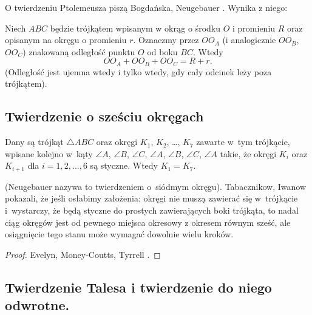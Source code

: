 O twierdzeniu Ptolemeusza piszą Bogdańska, Neugebauer \cite[s. 62, 63]{neugebauer_2018}.
Wynika z niego:

\begin{theorem}[Carnot, 1???]
    Niech $ABC$ będzie trójkątem wpisanym w okrąg o środku $O$ i promieniu $R$ oraz opisanym na okręgu o promieniu $r$.
    Oznaczmy przez $OO_A$ (i analogicznie $OO_B$, $OO_C$) znakowaną odległość punktu $O$ od boku $BC$.
    Wtedy 
    \begin{equation}
        OO_A + OO_B + OO_C = R + r.
    \end{equation}
    (Odległość jest ujemna wtedy i tylko wtedy, gdy cały odcinek leży poza trójkątem).
\end{theorem}


%
\subsection{Twierdzenie o sześciu okręgach}

\begin{proposition}
%
    Dany są trójkąt $\triangle ABC$ oraz okręgi $K_1$, $K_2$, \ldots, $K_7$ zawarte w~tym trójkącie, wpisane kolejno w~kąty $\angle A$, $\angle B$, $\angle C$, $\angle A$, $\angle B$, $\angle C$, $\angle A$ takie, że okręgi $K_i$ oraz $K_{i+1}$ dla $i = 1, 2, \ldots, 6$ są styczne.
    Wtedy $K_1 = K_7$.
\end{proposition}

(Neugebauer \cite[s. 101]{neugebauer_2018} nazywa to twierdzeniem o~siódmym okręgu).
Tabacznikow, Iwanow \cite{ivanov_tabachnikov_2016} pokazali, że jeśli osłabimy założenia: okręgi nie muszą zawierać się w~trójkącie i~wystarczy, że będą styczne do prostych zawierających boki trójkąta, to nadal ciąg okręgów jest od pewnego miejsca okresowy z okresem równym sześć, ale osiągnięcie tego stanu może wymagać dowolnie wielu kroków.
%
%

\begin{proof}
    Evelyn, Money-Coutts, Tyrrell \cite[s. 49–58]{evelyn_money_coutts_tyrrell_1974}.
%
%
%
\end{proof}

%


\subsection{Twierdzenie Talesa i twierdzenie do niego odwrotne.}

